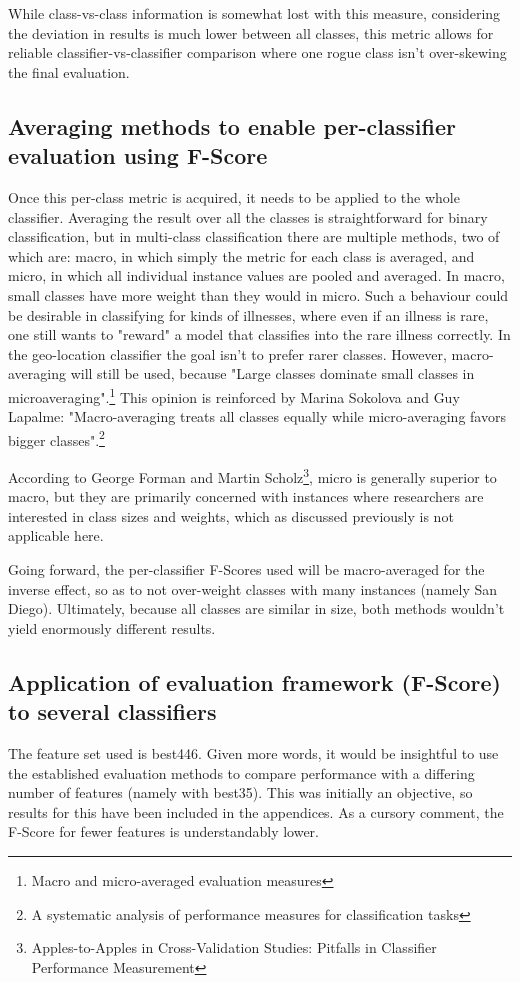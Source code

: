 \documentclass[twocolumn]{article}
\begin{document}
While class-vs-class information is somewhat lost with this measure, considering the deviation in results is much lower between all classes, this metric allows for reliable classifier-vs-classifier comparison where one rogue class isn't over-skewing the final evaluation.


\subsection{Averaging methods to enable per-classifier evaluation using F-Score}
Once this per-class metric is acquired, it needs to be applied to the whole classifier. Averaging the result over all the classes is straightforward for binary classification, but in multi-class classification there are multiple methods, two of which are: macro, in which simply the metric for each class is averaged, and micro, in which all individual instance values are pooled and averaged. In macro, small classes have more weight than they would in micro. Such a behaviour could be desirable in classifying for kinds of illnesses, where even if an illness is rare, one still wants to "reward" a model that classifies into the rare illness correctly. In the geo-location classifier the goal isn't to prefer rarer classes. However, macro-averaging will still be used, because "Large classes dominate small classes in microaveraging".\footnote{\cite{vincentvanasch2013} Macro and micro-averaged evaluation measures} This opinion is reinforced by Marina Sokolova and Guy Lapalme: "Macro-averaging treats all classes equally while micro-averaging favors bigger classes".\footnote{\cite{sokolovam.lapalmeg.2009} A systematic analysis of performance measures for classification tasks}

According to George Forman and Martin Scholz\footnote{\cite{formang.scholzm2010} Apples-to-Apples in Cross-Validation Studies: Pitfalls in Classifier Performance Measurement}, micro is generally superior to macro, but they are primarily concerned with instances where researchers are interested in class sizes and weights, which as discussed previously is not applicable here.

Going forward, the per-classifier F-Scores used will be macro-averaged for the inverse effect, so as to not over-weight classes with many instances (namely San Diego). Ultimately, because all classes are similar in size, both methods wouldn't yield enormously different results.


\subsection{Application of evaluation framework (F-Score) to several classifiers}
The feature set used is best446. Given more words, it would be insightful to use the established evaluation methods to compare performance with a differing number of features (namely with best35). This was initially an objective, so results for this have been included in the appendices. As a cursory comment, the F-Score for fewer features is understandably lower. 
\end{document}
